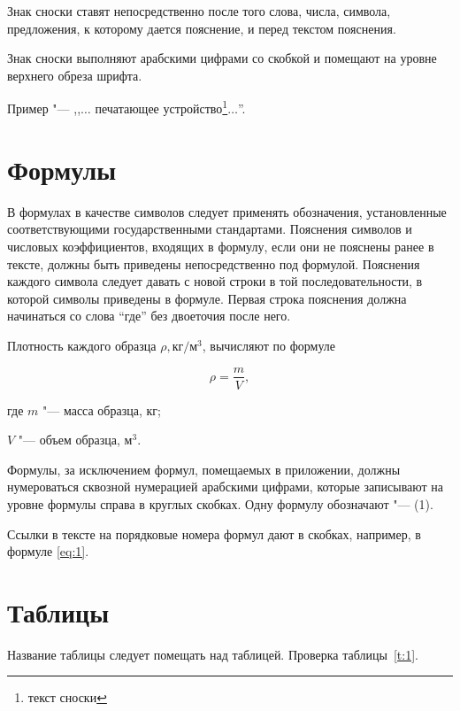 \point Знак сноски ставят непосредственно после того слова, числа,
символа, предложения, к которому дается пояснение, и перед текстом
пояснения.

\point Знак сноски выполняют арабскими цифрами со скобкой и помещают
на уровне верхнего обреза шрифта.

Пример "--- ,,$\ldots$ печатающее устройство\footnote{текст сноски}$\ldots$''.

\section{Формулы}

\point В формулах в качестве символов следует применять
обозначения, установленные соответствующими государственными
стандартами. Пояснения символов и числовых коэффициентов, входящих
в формулу, если они не пояснены ранее в тексте, должны быть
приведены непосредственно под формулой. Пояснения каждого символа
следует давать с новой строки в той последовательности, в которой
символы приведены в формуле. Первая строка пояснения должна
начинаться со слова ``где'' без двоеточия после него.

Плотность каждого образца $\rho, \text{кг}/\text{м}^3$, вычисляют
по формуле

\begin{equation}
\label{eq:1}
\rho = \frac{m}{V},
\end{equation}

\begin{ESKDexplanation}
\item[где ] $m$ "--- масса образца, кг;
\item $V$ "--- объем образца, $\text{м}^3$.
\end{ESKDexplanation}

\point Формулы, за исключением формул, помещаемых в приложении,
должны нумероваться сквозной нумерацией арабскими цифрами, которые
записывают на уровне формулы справа в круглых скобках. Одну формулу
обозначают "--- (1).

Ссылки в тексте на порядковые номера формул дают в скобках,
например, в формуле \eqref{eq:1}.

\section{Таблицы}

Название таблицы следует помещать над таблицей. Проверка
таблицы~\ref{t:1}.

